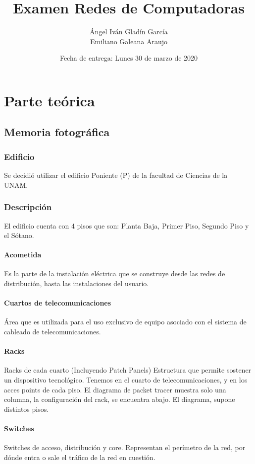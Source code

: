 \documentclass[spanish,12pt,letterpaper]{article}
\title{Examen Redes de Computadoras}
\author{Ángel Iván Gladín García\\
  Emiliano Galeana Araujo}
\affil{Facultad de ciencias, UNAM}
\date{Fecha de entrega: Lunes 30 de marzo de 2020}
\begin{document}
\maketitle

\section{Parte teórica}

\subsection{Memoria fotográfica}
\subsubsection{Edificio}
Se decidió utilizar el edificio Poniente (P) de la facultad de Ciencias de la
UNAM.

\subsubsection{Descripción}
El edificio cuenta con 4 pisos que son: Planta Baja, Primer Piso, Segundo Piso y
el Sótano.

\paragraph{Acometida} Es la parte de la instalación eléctrica que se construye
desde las redes de distribución, hasta las instalaciones del usuario.

\paragraph{Cuartos de telecomunicaciones} Área que es utilizada para el uso
exclusivo de equipo asociado  con el sistema de cableado de telecomunicaciones.

\paragraph{Racks} Racks de cada cuarto (Incluyendo Patch Panels) Estructura que
permite sostener un dispositivo tecnológico. Tenemos en el cuarto de
telecomunicaciones, y en los acces points de cada piso. El diagrama de packet
tracer muestra solo una columna, la configuración del rack, se encuentra abajo.
El diagrama, supone distintos pisos.

\paragraph{Switches} Switches de acceso, distribución y core. Representan el
perímetro de la red, por dónde entra o sale el tráfico de la red en cuestión.
\end{document}
